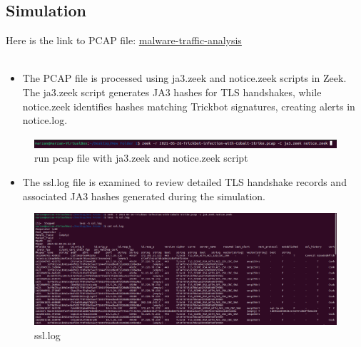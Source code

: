 \subsection {Simulation}

Here is the link to PCAP file:
\href{https://www.malware-traffic-analysis.net/tutorials/index.html}{malware-traffic-analysis}\\\\

\begin{itemize}
    \item The PCAP file is processed using ja3.zeek and notice.zeek scripts in Zeek. The ja3.zeek script generates JA3 hashes for TLS handshakes, while notice.zeek identifies hashes matching Trickbot signatures, creating alerts in notice.log.
\end{itemize}

\begin{figure}[H]
    \centering
    \includegraphics[width=1\linewidth]{images//ja3image/21.PNG}
    \caption{run pcap file with ja3.zeek and notice.zeek script}
    \label{fig:enter-label}
\end{figure}

\begin{itemize}
    \item The ssl.log file is examined to review detailed TLS handshake records and associated JA3 hashes generated during the simulation.
\end{itemize}
\begin{figure}[H]
    \centering
    \includegraphics[width=1\linewidth]{images//ja3image/22.PNG}
    \caption{ssl.log}
    \label{fig:enter-label}
\end{figure}


